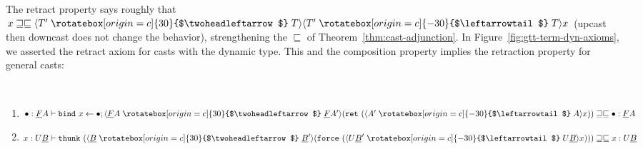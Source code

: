 \documentclass[acmsmall,nonacm]{acmart}
\renewcommand{\u}{\underline}
\newcommand{\ltdyn}{\sqsubseteq}
\newcommand{\gtdyn}{\sqsupseteq}
\newcommand{\equidyn}{\mathrel{\gtdyn\ltdyn}}
\newcommand{\dynv}{{?}}
\newcommand{\uarrow}{\mathrel{\rotatebox[origin=c]{-30}{$\leftarrowtail$}}}
\newcommand{\darrow}{\mathrel{\rotatebox[origin=c]{30}{$\twoheadleftarrow$}}}
\newcommand{\upcast}[2]{\langle{#2}\uarrow{#1}\rangle}
\newcommand{\dncast}[2]{\langle{#1}\darrow{#2}\rangle}
\newcommand{\bindXtoYinZ}[2]{\kw{bind}#2 \leftarrow #1;}
\newcommand{\kw}[1]{\texttt{#1}\,\,}
\newcommand{\ret}{\kw{ret}}
\newcommand{\thunk}{\kw{thunk}}
\newcommand{\force}{\kw{force}}
\begin{document}
The retract property says roughly that $x \equidyn
\dncast{T'}{T}{\upcast{T}{T'}{x}}$ (upcast then downcast does not change
the behavior), strengthening the $\ltdyn$ of
Theorem~\ref{thm:cast-adjunction}.  In
Figure~\ref{fig:gtt-term-dyn-axioms}, we asserted the retract axiom for
casts with the dynamic type.  This and the composition property implies
the retraction property for general casts:
\begin{theorem} ~~~ \label{thm:retract-general}
  \begin{enumerate}
  \item
    $\bullet : \u F A \vdash \bindXtoYinZ{\bullet}{x}{\dncast{\u F A}{\u F A'}{(\ret{(\upcast{A}{A'}{x})})}} \equidyn \bullet  : \u F A$
  \item
    $x : U \u B \vdash \thunk{(\dncast{\u B}{\u B'}{(\force{(\upcast{U \u B}{U \u B'}{x})})})} \equidyn x : U \u B$
  \end{enumerate}
\end{theorem}
\end{document}
